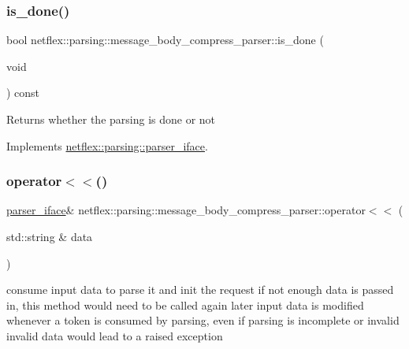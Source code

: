 \subsubsection{\texorpdfstring{is\+\_\+done()}{is\_done()}}
{\footnotesize\ttfamily bool netflex\+::parsing\+::message\+\_\+body\+\_\+compress\+\_\+parser\+::is\+\_\+done (\begin{DoxyParamCaption}\item[{void}]{ }\end{DoxyParamCaption}) const\hspace{0.3cm}{\ttfamily [virtual]}}

\begin{DoxyReturn}{Returns}
whether the parsing is done or not 
\end{DoxyReturn}


Implements \hyperlink{classnetflex_1_1parsing_1_1parser__iface_afebd1cc50d5958f712dfac0c023fd162}{netflex\+::parsing\+::parser\+\_\+iface}.

\mbox{\label{classnetflex_1_1parsing_1_1message__body__compress__parser_ae8a77a83553e646915d0eed3ef25684c}} 
\subsubsection{\texorpdfstring{operator$<$$<$()}{operator<<()}}
{\footnotesize\ttfamily \hyperlink{classnetflex_1_1parsing_1_1parser__iface}{parser\+\_\+iface}\& netflex\+::parsing\+::message\+\_\+body\+\_\+compress\+\_\+parser\+::operator$<$$<$ (\begin{DoxyParamCaption}\item[{std\+::string \&}]{data }\end{DoxyParamCaption})\hspace{0.3cm}{\ttfamily [virtual]}}

consume input data to parse it and init the request if not enough data is passed in, this method would need to be called again later input data is modified whenever a token is consumed by parsing, even if parsing is incomplete or invalid invalid data would lead to a raised exception


